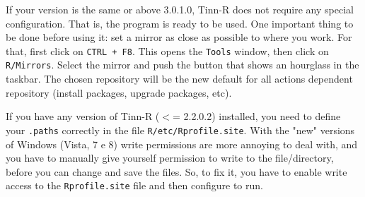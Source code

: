 If your version is the same or above 3.0.1.0, Tinn-R does not require any special configuration.
That is, the program is ready to be used. One important thing to be done before using it:
set a \RR{} mirror as close as possible to where you work. For that, first click on \texttt{CTRL + F8}.
This opens the \texttt{Tools} window, then click on \texttt{R/Mirrors}.
Select the \RR{} mirror and push the button that shows an hourglass in the taskbar.
The chosen repository will be the new default for all actions dependent repository
(install packages, upgrade packages, etc).

If you have any version of Tinn-R ($<$= 2.2.0.2) installed,
you need to define your \texttt{.paths} correctly in the file \texttt{R/etc/Rprofile.site}.
With the "new" versions of Windows (Vista, 7 e 8) write permissions are more annoying to deal with,
and you have to manually give yourself permission to write to the file/directory,
before you can change and save the files. So, to fix it, you have to enable write
access to the \texttt{Rprofile.site} file and then configure \RR{} to run.


